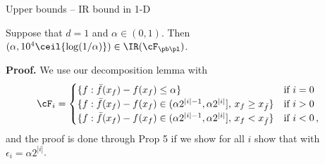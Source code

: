 \begin{frame}{Upper bounds -- IR bound in 1-D}
    \small
    \begin{tcolorbox}[title=Theorem 6 -- IR bound for 1-D,colback=blue!5!white,colframe=blue!50!black]
        Suppose that $d = 1$ and $\alpha \in (0,1)$. Then $(\alpha, 10^4 \ceil{\log(1/\alpha)}) \in \IR(\cF_{\pb\pl})$.
    \end{tcolorbox}
    \textbf{Proof.}
    We use our decomposition lemma with
    \begin{align*}
        \cF_i & = \begin{cases}
                      \{f : \bar f(x_f) - f(x_f) \leq \alpha \}                                                  & \text{if } i = 0          \\
                      \{f : \bar f(x_f) - f(x_f) \in (\alpha 2^{|i|-1}, \alpha 2^{|i|}],\, x_f \geq x_{\bar f}\} & \text{if } i > 0          \\
                      \{f : \bar f(x_f) - f(x_f) \in (\alpha 2^{|i|-1}, \alpha 2^{|i|}],\, x_f < x_{\bar f}\}    & \text{if } i < 0      \,,
                  \end{cases}
    \end{align*}
    and the proof is done through Prop 5 if we show
    for all $i$ show that with $\epsilon_i = \alpha2^{|i|}$.
\end{frame}
